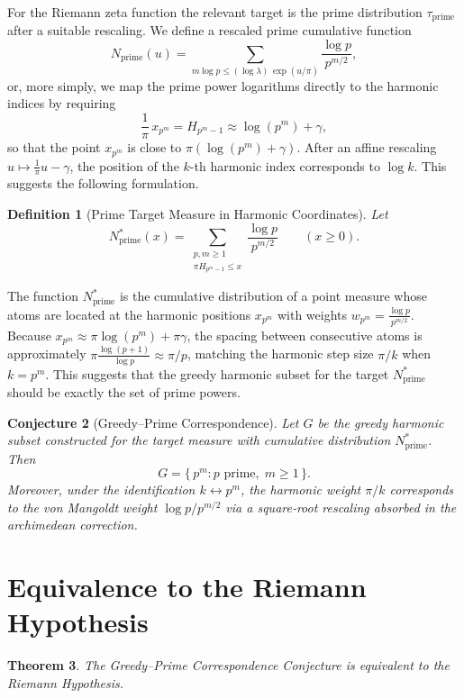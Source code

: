 \documentclass[12pt,a4paper,twoside,openright]{book}
\newtheorem{theorem}{Theorem}[chapter]
\newtheorem{conjecture}[theorem]{Conjecture}
\newtheorem{definition}[theorem]{Definition}
\begin{document}
For the Riemann zeta function the relevant target is the prime distribution \(\tau_{\mathrm{prime}}\) after a suitable rescaling.  We define a rescaled prime cumulative function
\[
N_{\mathrm{prime}}(u) = \sum_{m\log p \le (\log\lambda)\, \exp(u/\pi)} \frac{\log p}{p^{m/2}},
\]
or, more simply, we map the prime power logarithms directly to the harmonic indices by requiring
\[
\frac{1}{\pi}\, x_{p^m} = H_{p^m-1} \approx \log(p^m) + \gamma,
\]
so that the point \(x_{p^m}\) is close to \(\pi(\log(p^m)+\gamma)\).  After an affine rescaling \(u \mapsto \frac{1}{\pi}u - \gamma\), the position of the \(k\)-th harmonic index corresponds to \(\log k\).  This suggests the following formulation.

\begin{definition}[Prime Target Measure in Harmonic Coordinates]
Let
\[
N_{\mathrm{prime}}^*(x) = \sum_{\substack{p,m\ge 1\\ \pi H_{p^m-1} \le x}} \frac{\log p}{p^{m/2}} \qquad (x\ge 0).
\]
\end{definition}

The function \(N_{\mathrm{prime}}^*\) is the cumulative distribution of a point measure whose atoms are located at the harmonic positions \(x_{p^m}\) with weights \(w_{p^m} = \frac{\log p}{p^{m/2}}\).  Because \(x_{p^m} \approx \pi \log(p^m) + \pi\gamma\), the spacing between consecutive atoms is approximately \(\pi \frac{\log(p+1)}{\log p} \approx \pi/p\), matching the harmonic step size \(\pi/k\) when \(k=p^m\).  This suggests that the greedy harmonic subset for the target \(N_{\mathrm{prime}}^*\) should be exactly the set of prime powers.

\begin{conjecture}[Greedy--Prime Correspondence]\label{conj:GPC}
Let \(G\) be the greedy harmonic subset constructed for the target measure with cumulative distribution \(N_{\mathrm{prime}}^*\).  Then
\[
G = \{\,p^m : p \text{ prime},\; m\ge 1 \,\}.
\]
Moreover, under the identification \(k \leftrightarrow p^m\), the harmonic weight \(\pi/k\) corresponds to the von Mangoldt weight \(\log p/p^{m/2}\) via a square‑root rescaling absorbed in the archimedean correction.
\end{conjecture}

\section{Equivalence to the Riemann Hypothesis}

\begin{theorem}\label{thm:equiv}
The Greedy--Prime Correspondence Conjecture is equivalent to the Riemann Hypothesis.
\end{theorem}
\end{document}
